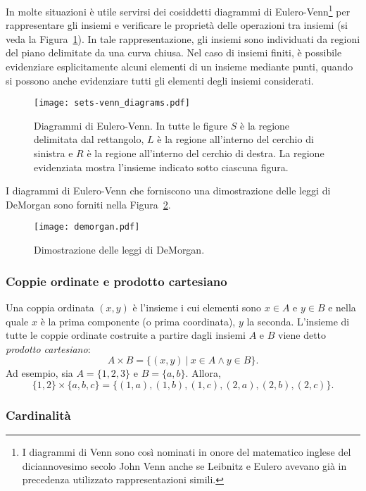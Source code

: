 In molte situazioni è utile servirsi dei cosiddetti diagrammi di Eulero-Venn\footnote{I diagrammi di Venn sono così nominati in onore del matematico inglese del diciannovesimo secolo John Venn anche se Leibnitz e Eulero avevano già in precedenza utilizzato rappresentazioni simili.} per rappresentare gli insiemi e verificare le proprietà delle operazioni tra insiemi (si veda la Figura~\ref{fig:sets-venn-diagrams}). 
In tale rappresentazione, gli insiemi sono individuati da regioni del piano delimitate da una curva chiusa. 
Nel caso di insiemi finiti, è possibile evidenziare esplicitamente alcuni elementi di un insieme mediante punti, quando si possono anche evidenziare tutti gli elementi degli insiemi considerati.
\begin{figure}[h!]
  \centering
    \texttt{[image: sets-venn\_diagrams.pdf]}
    \caption{Diagrammi di Eulero-Venn. In tutte le figure $S$ è la regione delimitata dal rettangolo, $L$ è la regione all'interno del cerchio di sinistra e $R$ è la regione all'interno del cerchio di destra. La regione evidenziata mostra l'insieme indicato sotto ciascuna figura. }
    \label{fig:sets-venn-diagrams}
\end{figure}

I diagrammi di Eulero-Venn che forniscono una dimostrazione delle leggi di DeMorgan sono forniti nella Figura~\ref{fig:demorgan}.
\begin{figure}[h!]
\centering 
   \texttt{[image: demorgan.pdf]}
    \caption{Dimostrazione delle leggi di DeMorgan. }
    \label{fig:demorgan}
\end{figure}

\subsubsection*{Coppie ordinate e prodotto cartesiano}
\label{sec:prod_cartesiano}

Una coppia ordinata $(x,y)$ è l'insieme i cui elementi sono $x \in A$ e $y \in B$ e nella quale $x$ è la prima componente (o prima coordinata), $y$ la seconda. 
L'insieme di tutte le coppie ordinate costruite a partire dagli insiemi $A$ e $B$ viene detto  \emph{prodotto cartesiano}:
$$A \times B = \{(x, y) ~\vert~ x \in A \land y \in B\}.$$
Ad esempio, sia $A = \{1, 2, 3\}$ e $B = \{a, b\}$. Allora,
$$
\{1, 2\} \times \{a, b, c\} = \{(1, a), (1, b), (1, c), (2, a), (2, b), (2, c)\}.
$$

\subsubsection*{Cardinalità}

